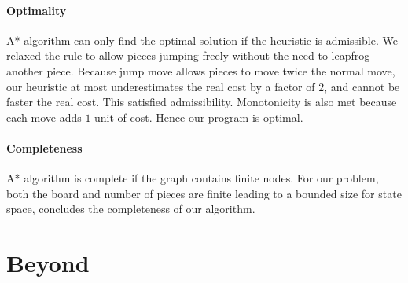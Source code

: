 \documentclass[10.5pt,a4paper]{article}
\begin{document}
        \paragraph{Optimality} A* algorithm can only find the optimal solution if the heuristic is admissible. We relaxed the rule to allow pieces jumping freely without the need to leapfrog another piece. Because jump move allows pieces to move twice the normal move, our heuristic at most underestimates the real cost by a factor of $2$, and cannot be faster the real cost. This satisfied admissibility. Monotonicity is also met because each move adds $1$ unit of cost. Hence our program is optimal.
        \vspace{-10pt}
        \paragraph{Completeness} A* algorithm is complete if the graph contains finite nodes. For our problem, both the board and number of pieces are finite leading to a bounded size for state space, concludes the completeness of our algorithm.
    \section{Beyond}
    
\end{document}
